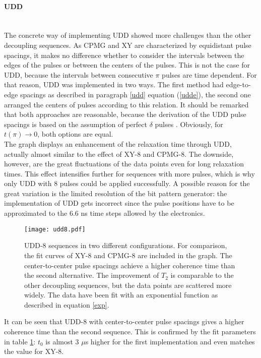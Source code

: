 \documentclass[12pt,a4paper]{article}
\begin{document}
\paragraph{UDD}\mbox{}\\
The concrete way of implementing UDD showed more challenges than the other decoupling sequences. As CPMG and XY are characterized by equidistant pulse spacings, it makes no difference whether to consider the intervals between the edges of the pulses or between the centers of the pulses. This is not the case for UDD, because the intervals between consecutive $\pi$ pulses are time dependent. For that reason, UDD was implemented in two ways. The first method had edge-to-edge spacings as described in paragraph \ref{udd} equation (\ref{udde}), the second one arranged the centers of pulses according to this relation. It should be remarked that both approaches are reasonable, because the derivation of the UDD pulse spacings is based on the assumption of perfect $\delta$ pulses \cite{udd}. Obviously, for $t(\pi)\rightarrow 0$, both options are equal.\\
The graph displays an enhancement of the relaxation time through UDD, actually almost similar to the effect of XY-8 and CPMG-8. The downside, however, are the great fluctuations of the data points even for long relaxation times. This effect intensifies further for sequences with more pulses, which is why only UDD with 8 pulses could be applied successfully. A possible reason for the great variation is the limited resolution of the bit pattern generator: the implementation of UDD gets incorrect since the pulse positions have to be approximated to the 6.6 ns time steps allowed by the electronics.
\\
\begin{figure}[H] 
\texttt{[image: udd8.pdf]} 
\caption{UDD-8 sequences in two different configurations. For comparison, the fit curves of XY-8 and CPMG-8 are included in the graph. The center-to-center pulse spacings achieve a higher coherence time than the second alternative. The improvement of $T_2$ is comparable to the other decoupling sequences, but the data points are scattered more widely. The data have been fit with an exponential function as described in equation \ref{exp}.}
\label{U8}
\end{figure}
It can be seen that UDD-8 with center-to-center pulse spacings gives a higher coherence time than the second sequence. This is confirmed by the fit parameters in table \ref{U8}: $t_0$ is almost 3 $\mu$s higher for the first implementation and even matches the value for XY-8.\\
\end{document}
